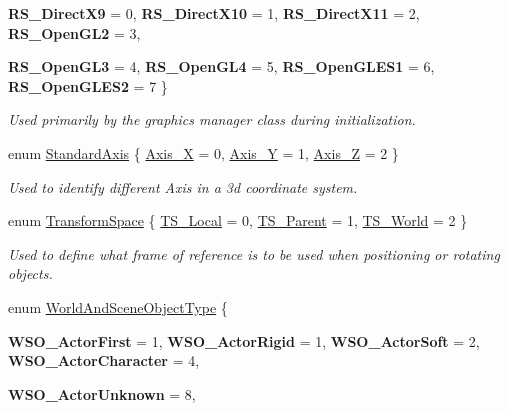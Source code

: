 \begin{DoxyCompactItemize}
{\bfseries RS\_\-DirectX9} =  0, 
{\bfseries RS\_\-DirectX10} =  1, 
{\bfseries RS\_\-DirectX11} =  2, 
{\bfseries RS\_\-OpenGL2} =  3, 
\par
{\bfseries RS\_\-OpenGL3} =  4, 
{\bfseries RS\_\-OpenGL4} =  5, 
{\bfseries RS\_\-OpenGLES1} =  6, 
{\bfseries RS\_\-OpenGLES2} =  7
 \}
\begin{DoxyCompactList}\small\item\em Used primarily by the graphics manager class during initialization. \item\end{DoxyCompactList}\item 
enum \hyperlink{namespaceMezzanine_ab41a00a8c6a47b576dc987ec34e16ba1}{StandardAxis} \{ \hyperlink{namespaceMezzanine_ab41a00a8c6a47b576dc987ec34e16ba1a823c8f182393aef96f017c7279d49126}{Axis\_\-X} =  0, 
\hyperlink{namespaceMezzanine_ab41a00a8c6a47b576dc987ec34e16ba1a935c7afe0104697553cf85e9214fb3fb}{Axis\_\-Y} =  1, 
\hyperlink{namespaceMezzanine_ab41a00a8c6a47b576dc987ec34e16ba1a6af6621383cc7da1fe11a86ba6de37c0}{Axis\_\-Z} =  2
 \}
\begin{DoxyCompactList}\small\item\em Used to identify different Axis in a 3d coordinate system. \item\end{DoxyCompactList}\item 
enum \hyperlink{namespaceMezzanine_ad81c74de3529f1e643bd145173924ed3}{TransformSpace} \{ \hyperlink{namespaceMezzanine_ad81c74de3529f1e643bd145173924ed3aa1986039b3e4c80c8564c8916e68e61c}{TS\_\-Local} =  0, 
\hyperlink{namespaceMezzanine_ad81c74de3529f1e643bd145173924ed3a352c41c07844c77508ce36b43a30b553}{TS\_\-Parent} =  1, 
\hyperlink{namespaceMezzanine_ad81c74de3529f1e643bd145173924ed3aeb8fde3835a59be182f10353d961882d}{TS\_\-World} =  2
 \}
\begin{DoxyCompactList}\small\item\em Used to define what frame of reference is to be used when positioning or rotating objects. \item\end{DoxyCompactList}\item 
enum \hyperlink{namespaceMezzanine_ae8cd04f706f4998be62f454b7119c718}{WorldAndSceneObjectType} \{ \par
{\bfseries WSO\_\-ActorFirst} =  1, 
{\bfseries WSO\_\-ActorRigid} =  1, 
{\bfseries WSO\_\-ActorSoft} =  2, 
{\bfseries WSO\_\-ActorCharacter} =  4, 
\par
{\bfseries WSO\_\-ActorUnknown} =  8, 

\end{DoxyCompactItemize}
